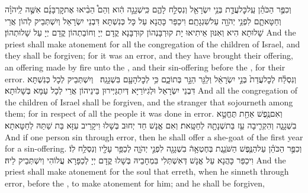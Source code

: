 {וְכִפֶּ֣ר הַכֹּהֵ֗ן עַֽל\maqqaf כׇּל\maqqaf עֲדַ֛ת בְּנֵ֥י יִשְׂרָאֵ֖ל וְנִסְלַ֣ח לָהֶ֑ם כִּֽי\maqqaf שְׁגָגָ֣ה הִ֔וא וְהֵם֩ הֵבִ֨יאוּ אֶת\maqqaf קׇרְבָּנָ֜ם אִשֶּׁ֣ה לַֽיהֹוָ֗ה וְחַטָּאתָ֛ם לִפְנֵ֥י יְהֹוָ֖ה עַל\maqqaf שִׁגְגָתָֽם׃}
{וִיכַפַּר כָּהֲנָא עַל כָּל כְּנִשְׁתָּא דִּבְנֵי יִשְׂרָאֵל וְיִשְׁתְּבֵיק לְהוֹן אֲרֵי שָׁלוּתָא הִיא וְאִנּוּן אֵיתִיאוּ יָת קוּרְבָּנְהוֹן קוּרְבָּנָא קֳדָם יְיָ וְחוֹבַתְהוֹן קֳדָם יְיָ עַל שָׁלוּתְהוֹן׃}
{And the priest shall make atonement for all the congregation of the children of Israel, and they shall be forgiven; for it was an error, and they have brought their offering, an offering made by fire unto the \lord, and their sin-offering before the \lord, for their error.}{}
{וְנִסְלַ֗ח לְכׇל\maqqaf עֲדַת֙ בְּנֵ֣י יִשְׂרָאֵ֔ל וְלַגֵּ֖ר הַגָּ֣ר בְּתוֹכָ֑ם כִּ֥י לְכׇל\maqqaf הָעָ֖ם בִּשְׁגָגָֽה׃ \setuma }
{וְיִשְׁתְּבֵיק לְכָל כְּנִשְׁתָּא דִּבְנֵי יִשְׂרָאֵל וּלְגִיּוֹרַיָּא דְּיִתְגַּיְּירוּן בֵּינֵיהוֹן אֲרֵי לְכָל עַמָּא בְּשָׁלוּתָא׃}
{And all the congregation of the children of Israel shall be forgiven, and the stranger that sojourneth among them; for in respect of all the people it was done in error.}{}
{וְאִם\maqqaf נֶ֥פֶשׁ אַחַ֖ת תֶּחֱטָ֣א בִשְׁגָגָ֑ה וְהִקְרִ֛יבָה עֵ֥ז בַּת\maqqaf שְׁנָתָ֖הּ לְחַטָּֽאת׃}
{וְאִם אֱנָשׁ חַד יְחוּב בְּשָׁלוּ וִיקָרֵיב עִזָּא בַּת שַׁתַּהּ לְחַטָּאתָא׃}
{And if one person sin through error, then he shall offer a she-goat of the first year for a sin-offering.}{}
{וְכִפֶּ֣ר הַכֹּהֵ֗ן עַל\maqqaf הַנֶּ֧פֶשׁ הַשֹּׁגֶ֛גֶת בְּחֶטְאָ֥הֿ בִשְׁגָגָ֖ה לִפְנֵ֣י יְהֹוָ֑ה לְכַפֵּ֥ר עָלָ֖יו וְנִסְלַ֥ח לֽוֹ׃}
{וִיכַפַּר כָּהֲנָא עַל אֱנָשׁ דְּאִשְׁתְּלִי בִּמְחָבֵיהּ בְּשָׁלוּ קֳדָם יְיָ לְכַפָּרָא עֲלוֹהִי וְיִשְׁתְּבֵיק לֵיהּ׃}
{And the priest shall make atonement for the soul that erreth, when he sinneth through error, before the \lord, to make atonement for him; and he shall be forgiven,}{}
